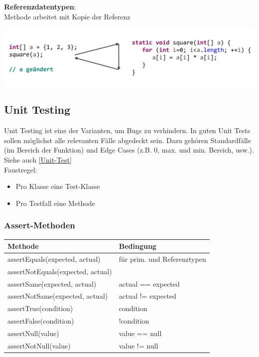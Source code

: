 \textbf{Referenzdatentypen}:\\
Methode arbeitet mit Kopie der Referenz
\begin{center}
    \includegraphics[width=0.9\columnwidth]{pictures/reference-params.png}    
\end{center}

\subsection{Unit Testing}
Unit Testing ist eine der Varianten, um Bugs zu verhindern. In guten Unit Tests sollen möglichst alle relevanten Fälle abgedeckt sein.
Dazu gehören Standardfälle (im Bereich der Funktion) und Edge Cases (z.B. 0, max. und min. Bereich, usw.). Siehe auch \ref{Unit-Test}\\
Faustregel:
\begin{itemize}
    \itemsep0em
    \item Pro Klasse eine Test-Klasse
    \item Pro Testfall eine Methode
\end{itemize}

\subsubsection{Assert-Methoden}
\begin{center}
    \begin{tabular}{ll}
        \rowcolor[RGB]{239,239,239} 
        \textbf{Methode} & \textbf{Bedingung} \\ \hline
        assertEquals(expected, actual) & für prim. und Referenztypen \\
        assertNotEquals(expected, actual) & \\
        assertSame(expected, actual) & actual == expected\\
        assertNotSame(expected, actual) & actual != expected\\
        assertTrue(condition) & condition\\
        assertFalse(condition) & !condition\\
        assertNull(value) & value == null\\
        assertNotNull(value) & value != null\\
    \end{tabular}
\end{center}

